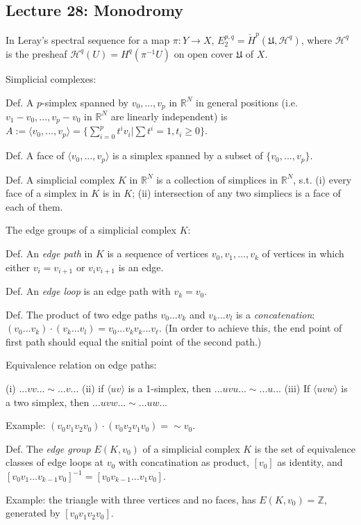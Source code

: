 \documentclass{article}
\theoremstyle{mystyle}
\theoremstyle{remark}
\numberwithin{equation}{section}
\begin{document}
\subsection{Lecture 28: Monodromy}

In Leray's spectral sequence for a map $\pi\colon Y\rightarrow X$, $E^{p,q}_2 = \check{H}^p(\mathfrak{U},\mathcal{H}^q)$, where $\mathcal{H}^q$ is the presheaf $\mathcal{H}^q(U) = H^q(\pi^{-1}U)$ on open cover $\mathfrak{U}$ of $X$.


Simplicial complexes: 

Def. A $p$-simplex spanned by $v_0,...,v_p$ in $\mathbb{R}^N$ in general positions (i.e. $v_1-v_0,...,v_p-v_0$ in $\mathbb{R}^N$ are linearly independent) is
$A:=\langle v_0,...,v_p\rangle = \{\sum_{i=0}^p t^iv_i | \sum t^i=1,t_i\geq 0\}$. 

Def. A face of $\langle v_0,...,v_p\rangle$ is a simplex spanned by a subset of $\{v_0,...,v_p\}$.

Def. A simplicial complex $K$ in $\mathbb{R}^N$ is a collection of simplices in $\mathbb{R}^N$, s.t. (i) every face of a simplex in $K$ is in $K$; (ii) intersection of any two simpliecs is a face of each of them. 

The edge groups of a simplicial complex $K$:

Def. An \emph{edge path} in $K$ is a sequence of vertices $v_0,v_1,...,v_k$ of vertices in which either $v_i=v_{i+1}$ or $v_iv_{i+1}$ is an edge. 

Def. An \emph{edge loop} is an edge path with $v_k=v_0$.

Def. The product of two edge paths $v_0...v_k$ and $v_k...v_l$ is a \emph{concatenation}:
$(v_0...v_k)\cdot (v_k...v_l) = v_0...v_kv_k...v_\ell$. (In order to achieve this, the end point of first path should equal the snitial point of the second path.)

Equivalence relation on edge paths:

(i) $...vv... \sim ...v...$
(ii) if $\langle u v \rangle$ is a 1-simplex, then $...uvu... \sim ...u...$ 
(iii) If $\langle uvw\rangle$ is a two simplex, then $...uvw...\sim ... uw...$

Example: $(v_0v_1v_2v_0)\cdot(v_0v_2v_1v_0) = \sim v_0$. 

Def. The \emph{edge group} $E(K,v_0)$ of a simplicial complex $K$ is the set of equivalence classes of edge loops at $v_0$ with concatination as product, $[v_0]$ as identity, and $[v_0v_1...v_{k-1}v_0]^{-1} = [v_0v_{k-1}...v_1v_0]$. 

Example: the triangle with three vertices and no faces, has  $E(K,v_0) = \mathbb{Z}$, generated by $[v_0v_1v_2v_0]$. 
\end{document}
